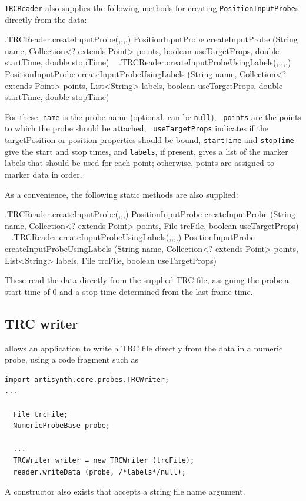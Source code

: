{\tt TRCReader} also supplies the following methods for
creating {\tt PositionInputProbe}s directly from the data:
%
\begin{methodtable}{0.9}{0.1}
%
\methodentry
{\probes.TRCReader.createInputProbe(,,,,)}%
{PositionInputProbe createInputProbe (String name, 
Collection<? extends Point> points,\brh
boolean useTargetProps, double startTime, double stopTime)}%
{\ }%
\methodspace{0.5em}%
%
\methodentry
{\probes.TRCReader.createInputProbeUsingLabels(,,,,,)}%
{PositionInputProbe createInputProbeUsingLabels (String name, 
Collection<? extends Point> points,\brh
List<String> labels, boolean useTargetProps, double startTime, double stopTime)}%
{\ }%
%
\end{methodtable}
%
For these, {\tt name} is the probe name (optional, can be {\tt null}), {\tt
points} are the points to which the probe should be attached, {\tt
useTargetProps} indicates if the {\sf targetPosition} or {\sf position}
properties should be bound, {\tt startTime} and {\tt stopTime} give the
start and stop times, and {\tt labels}, if present, gives a list of the marker
labels that should be used for each point; otherwise, points are assigned to
marker data in order.

As a convenience, the following static methods are also supplied:

\begin{methodtable}{0.9}{0.1}
%
\methodentry
{\probes.TRCReader.createInputProbe(,,,)}%
{PositionInputProbe createInputProbe (String name, 
Collection<? extends Point> points,\brh
File trcFile, boolean useTargetProps)}%
{\ }%
%
\methodspace{0.5em}%
%
\methodentry
{\probes.TRCReader.createInputProbeUsingLabels(,,,,)}%
{PositionInputProbe createInputProbeUsingLabels (String name, 
Collection<? extends Point> points,\brh
List<String> labels, File trcFile, boolean useTargetProps)}%
{\ }%
%
\end{methodtable}
%
These read the data directly from the supplied TRC file, assigning the probe a
start time of 0 and a stop time determined from the last frame time.

\subsection{TRC writer}
\label{TRCWriter:sec}

 allows an application to write a TRC file
directly from the data in a numeric probe, using a code fragment such as
%
\begin{lstlisting}[]
import artisynth.core.probes.TRCWriter;
...

  File trcFile;
  NumericProbeBase probe;

  ...
  TRCWriter writer = new TRCWriter (trcFile);
  reader.writeData (probe, /*labels*/null);
\end{lstlisting}
%
A constructor also exists that accepts a string file name argument.


